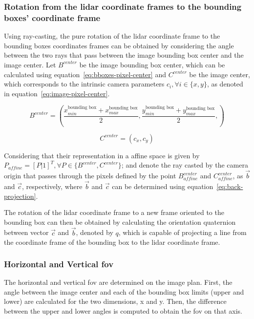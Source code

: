 \subsubsection{Rotation from the \ac{lidar} coordinate frames to the bounding boxes' coordinate frame}
Using ray-casting, the pure rotation of the \ac{lidar} coordinate frame to the bounding boxes coordinates frames can be obtained by considering the angle between the two rays that pass between the image bounding box center and the image center. Let $B^{center}$ be the image bounding box center, which can be calculated using equation~\ref{eq:bboxes-pixel-center} and $C^{center}$ be the image center, which corresponds to the intrinsic camera parameters $c_i, \forall i \in \{x, y\}$, as denoted in equation~\ref{eq:image-pixel-center}.

\begin{equation}
	\label{eq:bboxes-pixel-center}	
B^{center} = \left(\frac{x^{\text{bounding box}}_{min} + x^{\text{bounding box}}_{max}}{2}, \frac{y^{\text{bounding box}}_{min} + y^{\text{bounding box}}_{max}}{2},\right)
\end{equation}

\begin{equation}
\label{eq:image-pixel-center}
C^{center} = (c_x, c_y)
\end{equation}

Considering that their representation in a affine space is given by $P_{affine} = \left[P | 1\right]^T, \forall P \in \{B^{center}, C^{center}\}$; and denote the ray casted by the camera origin that passes through the pixels defined by the point $B^{center}_{affine}$ and $C^{center}_{affine}$, as $\vec{b}$ and $\vec{c}$, respectively, where  $\vec{b}$ and $\vec{c}$ can be determined using equation~\ref{eq:back-projection}.

The rotation of the \ac{lidar} coordinate frame to a new frame oriented to the bounding box can then be obtained by calculating the orientation quaternion between vector $\vec{c}$ and $\vec{b}$, denoted by $q$, which is capable of projecting a line from the coordinate frame of the bounding box to the \ac{lidar} coordinate frame.

\subsubsection{Horizontal and Vertical \ac{fov}}
The horizontal and vertical \ac{fov} are determined on the image plan. First, the angle between the image center and each of the bounding box limits (upper and lower) are calculated for the two dimensions, x and y. Then, the difference between the upper and lower angles is computed to obtain the \ac{fov} on that axis.

